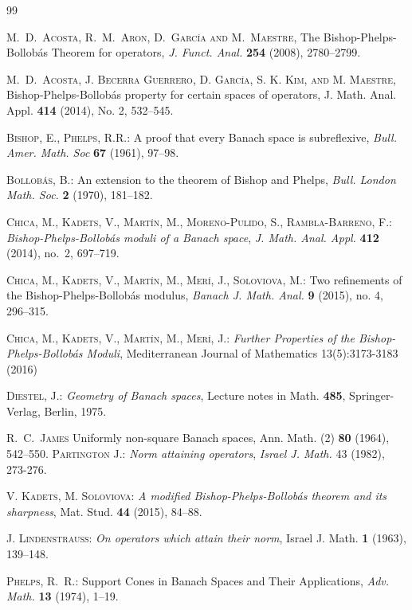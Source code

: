 \documentclass[11pt,a4paper]{amsart}
\numberwithin{equation}{section}
\theoremstyle{plain}
\theoremstyle{definition}
\begin{document}
\begin{thebibliography}{99}


\textsc{M.~D.~Acosta, R.~M.~Aron, D.~Garc\'ia and M.~Maestre}, The Bishop-Phelps-Bollob\'as Theorem for  operators, \emph{J. Funct. Anal.} {\bf 254} (2008), 2780--2799.

\textsc{M.~D.~Acosta,   J. Becerra Guerrero, D. Garc\'{\i}a, S. K. Kim, and M.  Maestre}, Bishop-Phelps-Bollob\'as property for certain spaces of operators, J. Math. Anal. Appl. \textbf{414} (2014), No. 2, 532--545.

 \textsc{Bishop, E., Phelps, R.R.}:
A proof that every Banach space is subreflexive, \emph{Bull. Amer. Math. Soc} \textbf{67} (1961), 97--98.

 \textsc{Bollob\'{a}s, B.}: An extension to the theorem of Bishop and Phelps, \emph{Bull. London Math. Soc.} \textbf{2} (1970), 181--182.

 \textsc{Chica, M., Kadets, V.,  Mart{\'{\i}}n, M., Moreno-Pulido, S.,
  Rambla-Barreno, F.}: \emph{Bishop-{P}helps-{B}ollob\'as
  moduli of a {B}anach space}, \emph{J. Math. Anal. Appl.} \textbf{412} (2014), no.~2, 697--719.
  
 \textsc{Chica, M., Kadets, V.,  Mart{\'{\i}}n, M., Mer{\'{\i}}, J., Soloviova, M.}:  Two refinements of the Bishop-Phelps-Bollob\'as modulus,  \emph{Banach J. Math. Anal.}  \textbf{9} (2015), no. 4, 296--315.
 
 \textsc{Chica, M., Kadets, V., Mart{\'{\i}}n, M., Mer{\'{\i}}, J.}:
\emph{Further Properties of the Bishop-{P}helps-{B}ollob\'as Moduli}, Mediterranean Journal of Mathematics 13(5):3173-3183  (2016)

  \textsc{Diestel, J.}: \emph{Geometry of Banach
spaces}, Lecture notes in Math. \textbf{485}, Springer-Verlag,
    Berlin, 1975.
    
\textsc{R.~C.~James}
 Uniformly non-square Banach spaces, Ann. Math. (2) \textbf{80} (1964), 542--550.
 \textsc{Partington J.}: \emph{Norm attaining operators}, \emph{Israel J. Math.} 43 (1982), 273-276.
 
\textsc{V. Kadets, M. Soloviova}: \emph{A modified Bishop-Phelps-Bollobás theorem and its sharpness}, Mat. Stud. \textbf{44} (2015), 84–88.

 \textsc{J. Lindenstrauss}: \emph{On operators which attain their norm}, Israel J. Math.  \textbf{1} (1963), 139--148.

 \textsc{Phelps, R.~R.}: Support Cones in Banach Spaces and Their Applications, \emph{Adv. Math.} \textbf{13} (1974), 1--19.

\end{thebibliography}
\end{document}
